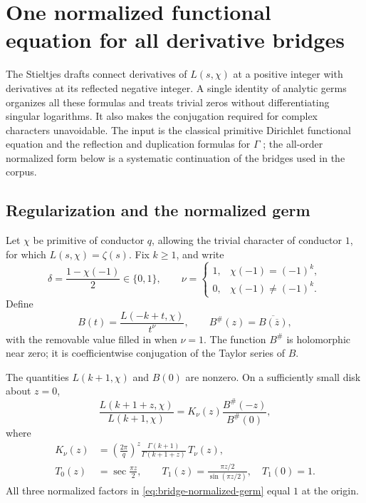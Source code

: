 \section{One normalized functional equation for all derivative bridges}
\label{sec:bridges}

The Stieltjes drafts connect derivatives of \(L(s,\chi)\) at a positive
integer with derivatives at its reflected negative integer. A single
identity of analytic germs organizes all these formulas and treats
trivial zeros without differentiating singular logarithms. It also
makes the conjugation required for complex characters unavoidable.
The input is the classical primitive Dirichlet functional equation
and the reflection and duplication formulas for \(\Gamma\)
\cite{DLMF}; the all-order normalized form below is a systematic
continuation of the bridges used in the corpus.

\subsection{Regularization and the normalized germ}

Let \(\chi\) be primitive of conductor \(q\), allowing the trivial
character of conductor \(1\), for which \(L(s,\chi)=\zeta(s)\).
Fix \(k\geq1\), and write
\[
 \delta=\frac{1-\chi(-1)}2\in\{0,1\},\qquad
 \nu=
 \begin{cases}
 1,&\chi(-1)=(-1)^k,\\
 0,&\chi(-1)\ne(-1)^k.
 \end{cases}
\]
Define
\begin{equation}
 B(t)=\frac{L(-k+t,\chi)}{t^\nu},
 \qquad
 B^\#(z)=\overline{B(\overline z)},
 \label{eq:bridge-regularization}
\end{equation}
with the removable value filled in when \(\nu=1\).
The function \(B^\#\) is holomorphic near zero; it is coefficientwise
conjugation of the Taylor series of \(B\).

\begin{theorem}
\label{thm:bridge-normalized}
The quantities \(L(k+1,\chi)\) and \(B(0)\) are nonzero. On a
sufficiently small disk about \(z=0\),
\begin{equation}
 \frac{L(k+1+z,\chi)}{L(k+1,\chi)}
 =
 K_\nu(z)\frac{B^\#(-z)}{B^\#(0)},
 \label{eq:bridge-normalized-germ}
\end{equation}
where
\begin{equation}
 \begin{aligned}
 K_\nu(z)&=
 \left(\frac{2\pi}{q}\right)^z
 \frac{\Gamma(k+1)}{\Gamma(k+1+z)}\,T_\nu(z),\\
 T_0(z)&=\sec\frac{\pi z}{2},\qquad
 T_1(z)=\frac{\pi z/2}{\sin(\pi z/2)},\quad T_1(0)=1.
 \end{aligned}
 \label{eq:bridge-elementary-kernel}
\end{equation}
All three normalized factors in
\eqref{eq:bridge-normalized-germ} equal \(1\) at the origin.
\end{theorem}

